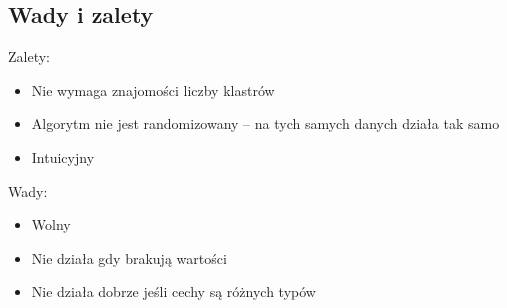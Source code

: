 \subsection{Wady i zalety}
Zalety:
\begin{itemize}
	\item Nie wymaga znajomości liczby klastrów
	\item Algorytm nie jest randomizowany -- na tych samych danych działa tak samo
	\item Intuicyjny
\end{itemize}
Wady:
\begin{itemize}
	\item Wolny
	\item Nie działa gdy brakują wartości
	\item Nie działa dobrze jeśli cechy są różnych typów
\end{itemize}